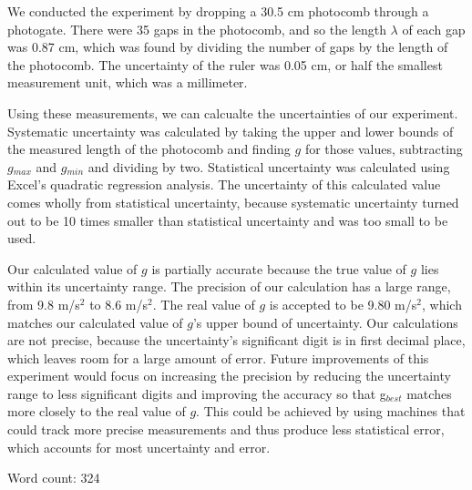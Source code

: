 \documentclass[11pt]{report}
\begin{document}
We conducted the experiment by dropping a 30.5 cm photocomb through a photogate.
There were 35 gaps in the photocomb, and so the length $\lambda$ of each gap was
0.87 cm, which was found by dividing the number of gaps by the length of the
photocomb. The uncertainty of the ruler was 0.05 cm, or half the smallest 
measurement unit, which was a millimeter. 

Using these measurements, we can calcualte the uncertainties of our experiment.  
Systematic uncertainty was calculated by taking the upper and lower bounds of
the measured length of the photocomb and finding \(g\) for those values,
subtracting \(g\)$_{max}$ and \(g\)$_{min}$ and dividing by two. Statistical
uncertainty was calculated using Excel's quadratic regression analysis.  
The uncertainty of this calculated value comes wholly from statistical
uncertainty, because systematic uncertainty turned out to be 10 times 
smaller than statistical uncertainty and was too small to be used. 
    
Our calculated value of \(g\) is partially accurate because the true value of
\(g\) lies within its uncertainty range.  The precision of our calculation has a large range, from 
9.8 m/s$^2$ to 8.6 m/s$^2$.  The real value of \(g\) is accepted to be 9.80 m/s$^2$, which matches our calculated value of
\(g\)'s upper bound of uncertainty.  Our calculations are not precise, because
the uncertainty's significant digit is in first decimal place, which leaves room
for a large amount of error.  
Future improvements of this experiment would focus on increasing the precision
by reducing the uncertainty range to less significant
digits and improving the accuracy so that g$_{best}$ matches more
closely to the real value of \(g\).  This could be achieved by using machines that 
could track more precise measurements and thus produce less statistical error, 
which accounts for most uncertainty and error.

Word count: 324 



\end{document}
